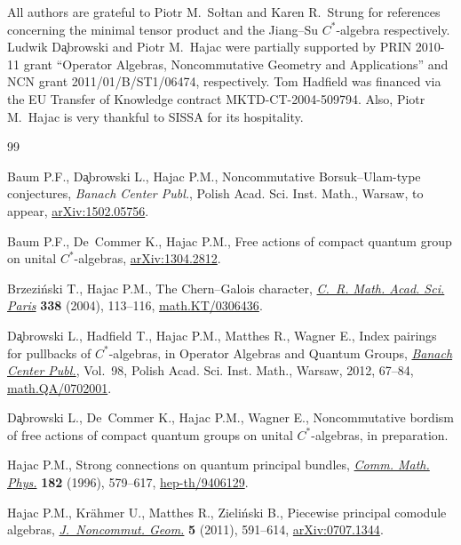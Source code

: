 \documentclass[pdftex]{sigma}
\numberwithin{equation}{section}
\begin{document}
All authors are grateful to Piotr M.~So{\l}tan and  Karen R.~Strung for references concerning
 the minimal tensor pro\-duct and the Jiang--Su $C^*$-algebra respectively.
 Ludwik D\c{a}browski and Piotr M.~Hajac  were  partially supported
by  PRIN 2010-11 grant ``Operator Algebras,
 Noncommutative Geometry and
Applications'' and NCN grant 2011/01/B/ST1/06474, respectively.
Tom Hadf\/ield was f\/inanced via the EU Transfer of Know\-ledge contract
MKTD-CT-2004-509794.  Also, Piotr M.~Hajac is very thankful to SISSA for its hospitality.


\begin{thebibliography}{99}
\footnotesize\itemsep=0pt

Baum P.F., D\c{a}browski L., Hajac P.M., Noncommutative Borsuk--Ulam-type
  conjectures, \textit{Banach Center Publ.}, Polish Acad. Sci.
  Inst. Math., Warsaw, {t}o appear, \href{http://arxiv.org/abs/1502.05756}{arXiv:1502.05756}.

Baum P.F., De~Commer K., Hajac P.M., Free actions of compact quantum group on
  unital $C^*$-algebras, \href{http://arxiv.org/abs/1304.2812}{arXiv:1304.2812}.

Brzezi{\'n}ski T., Hajac P.M., The {C}hern--{G}alois character, \href{http://dx.doi.org/10.1016/j.crma.2003.11.009}{\textit{C.~R.
  Math. Acad. Sci. Paris}} \textbf{338} (2004), 113--116,
  \href{http://arxiv.org/abs/math.KT/0306436}{math.KT/0306436}.

D{\c{a}}browski L., Hadf\/ield T., Hajac P.M., Matthes R., Wagner E., Index
  pairings for pullbacks of {${C}^*$}-algebras, in Operator Algebras and
  Quantum Groups, \href{http://dx.doi.org/10.4064/bc98-0-4}{\textit{Banach Center Publ.}}, Vol.~98, Polish Acad. Sci.
  Inst. Math., Warsaw, 2012, 67--84, \href{http://arxiv.org/abs/math.QA/0702001}{math.QA/0702001}.

D\c{a}browski L., De~Commer K., Hajac P.M., Wagner E., Noncommutative bordism
  of free actions of compact quantum groups on unital $C^*$-algebras, {i}n
  preparation.

Hajac P.M., Strong connections on quantum principal bundles, \href{http://dx.doi.org/10.1007/BF02506418}{\textit{Comm.
  Math. Phys.}} \textbf{182} (1996), 579--617, \href{http://arxiv.org/abs/hep-th/9406129}{hep-th/9406129}.

Hajac P.M., Kr{\"a}hmer U., Matthes R., Zieli{\'n}ski B., Piecewise principal
  comodule algebras, \href{http://dx.doi.org/10.4171/JNCG/88}{\textit{J.~Noncommut. Geom.}} \textbf{5} (2011), 591--614,
  \href{http://arxiv.org/abs/0707.1344}{arXiv:0707.1344}.


\end{thebibliography}
\end{document}
